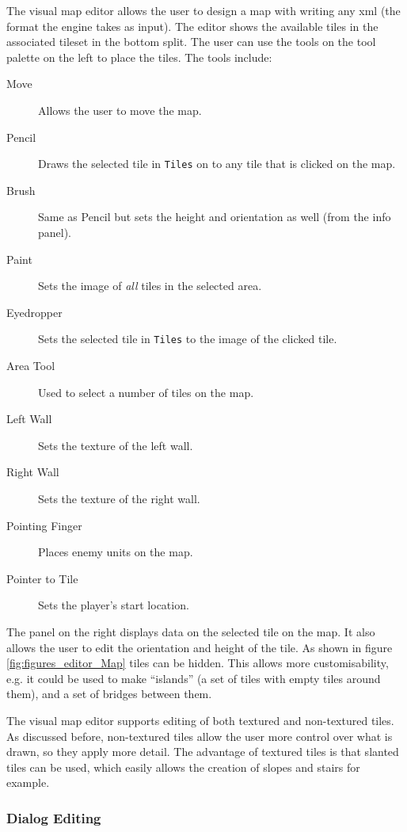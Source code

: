 The visual map editor allows the user to design a map with writing any xml (the format the engine takes as input).  The editor shows the available tiles in the associated tileset in the bottom split.  The user can use the tools on the tool palette on the left to place the tiles.  The tools include:

\begin{description}
	\item[Move]   Allows the user to move the map.
	\item[Pencil] Draws the selected tile in \texttt{Tiles} on to any tile that is clicked on the map.
	\item[Brush]  Same as Pencil but sets the height and orientation as well (from the info panel).
	\item[Paint]  Sets the image of \emph{all} tiles in the selected area.
	\item[Eyedropper]  Sets the selected tile in \texttt{Tiles} to the image of the clicked tile.
	\item[Area Tool]  Used to select a number of tiles on the map.
	\item[Left Wall]  Sets the texture of the left wall.
	\item[Right Wall] Sets the texture of the right wall.
	\item[Pointing Finger]  Places enemy units on the map.
	\item[Pointer to Tile]  Sets the player's start location.
\end{description}

The panel on the right displays data on the selected tile on the map. It also allows the user to edit the orientation and height of the tile.  As shown in figure \ref{fig:figures_editor_Map}  tiles can be hidden. This allows more customisability, e.g. it could be used to make ``islands''  (a set of tiles with empty tiles around them),  and a set of bridges between them. 

The visual map editor supports editing  of both textured and non-textured tiles. As discussed before, non-textured tiles allow the user more control over what is drawn, so they  apply more detail. The advantage of textured tiles is that slanted tiles can be used, which easily allows the creation of slopes and stairs for example.


\clearpage
\subsubsection{Dialog Editing}
\label{ssub:dialog_editing}


